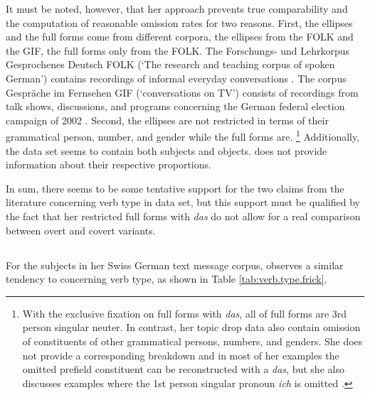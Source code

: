 It must be noted, however, that her approach prevents true comparability and the computation of reasonable omission rates for two reasons.
First, the ellipses and the full forms come from different corpora, the ellipses from the FOLK and the GIF, the full forms only from the FOLK.
The Forschungs- und Lehrkorpus Gesprochenes Deutsch FOLK (`The research and teaching corpus of spoken German') \citep{schmidt2014} contains recordings of informal everyday conversations \citep[65]{helmer2016}.
The corpus Gespräche im Fernsehen GIF (`conversations on TV') consists of recordings from talk shows, discussions, and programs concerning the German federal election campaign of 2002 \citep{GIF}.
Second, the ellipses are not restricted in terms of their grammatical person, number, and gender while the full forms are.%
\footnote{With the exclusive fixation on full forms with \textit{das}, all of  full forms are 3rd person singular neuter.
In contrast, her topic drop data also contain omission of constituents of other grammatical persons, numbers, and genders.
She does not provide a corresponding breakdown and in most of her examples the omitted prefield constituent can be reconstructed with a \textit{das}, but she also discusses examples where the 1st person singular pronoun \textit{ich} is omitted \citep[e.g.,][98, example 19]{helmer2016}.}
%
Additionally, the data set seems to contain both subjects and objects.
\citet{helmer2016} does not provide information about their respective proportions.

In sum, there seems to be some tentative support for the two claims from the literature concerning verb type in  data set, but this support must be qualified  by the fact that her restricted full forms with \textit{das} do not allow for a real comparison between overt and covert variants.

\subsection{\citet{frick2017}}
\largerpage
For the subjects in her Swiss German text message corpus, \citet{frick2017} observes a similar tendency to \citet{androutsopoulos.schmidt2002} concerning verb type, as shown in Table \ref{tab:verb.type.frick}.

